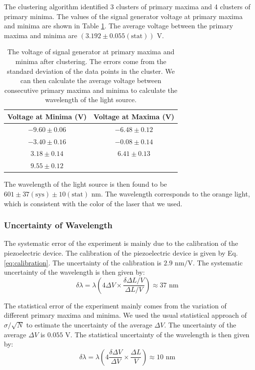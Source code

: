 The clustering algorithm identified 3 clusters of primary maxima and 4 clusters of primary minima. The values of the signal generator voltage at primary maxima and minima are shown in Table \ref{tab:minima_maxima}. The average voltage between the primary maxima and minima are $(3.192 \pm 0.055 (\text{stat})) \text{ V}$. 

\begin{table}[h]
    \centering
    \begin{tabular}{|c|c|}
        \hline
        \textbf{Voltage at Minima (V)} & \textbf{Voltage at Maxima (V)} \\
        \hline
        $-9.60 \pm 0.06$ & $-6.48 \pm 0.12$ \\
        \hline
        $-3.40 \pm 0.16$ & $-0.08 \pm 0.14$ \\
        \hline
        $3.18 \pm 0.14$  & $6.41 \pm 0.13$  \\
        \hline
        $9.55 \pm 0.12$  &  \\
        \hline
    \end{tabular}
    \caption{The voltage of signal generator at primary maxima and minima after clustering. The errors come from the standard deviation of the data points in the cluster. We can then calculate the average voltage between consecutive primary maxima and minima to calculate the wavelength of the light source.}
    \label{tab:minima_maxima}
\end{table}

The wavelength of the light source is then found to be $601\pm37(\text{sys})\pm10(\text{stat})\text{ nm}$. The wavelength corresponds to the orange light, which is consistent with the color of the laser that we used.

\subsubsection{Uncertainty of Wavelength}
The systematic error of the experiment is mainly due to the calibration of the piezoelectric device. The calibration of the piezoelectric device is given by Eq. \eqref{eq:calibration}. The uncertainty of the calibration is $2.9 \text{ nm/V}$. The systematic uncertainty of the wavelength is then given by:
\begin{equation}
    \delta \lambda = \lambda \left(4 \Delta V \times  \frac{\delta \Delta L / V}{\Delta L/V}\right) \approx 37 \text{ nm}
\end{equation}

The statistical error of the experiment mainly comes from the variation of different primary maxima and minima. We used the usual statistical approach of $\sigma/\sqrt{N}$ to estimate the uncertainty of the average $\Delta V$. The uncertainty of the average $\Delta V$ is $0.055 \text{ V}$. The statistical uncertainty of the wavelength is then given by:
\begin{equation}
    \delta \lambda = \lambda \left(4 \frac{\delta \Delta V}{\Delta V} \times \frac{\Delta L}{V}\right) \approx 10 \text{ nm}
\end{equation}
 

